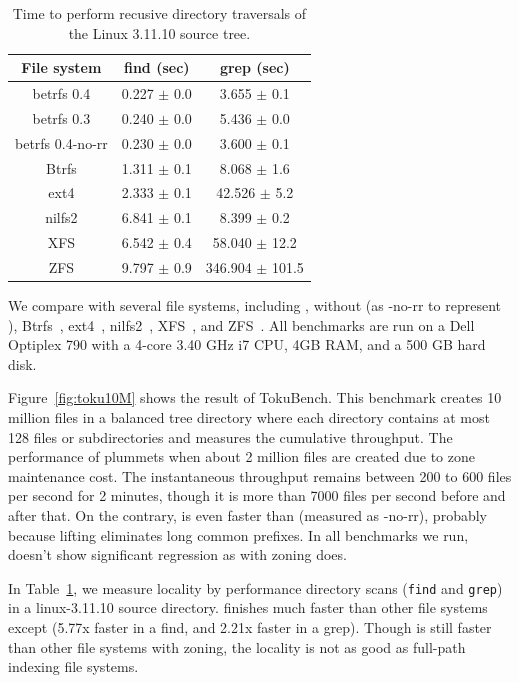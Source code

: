 \begin{table}[t]
  \centering
  \begin{tabular}{c | c c}
    \hline
    File system & find (sec) & grep (sec) \\
    \hline
    \hline
    betrfs 0.4  &  0.227  $\pm$  0.0 &  \xspace3.655  $\pm$ 0.1 \\
    betrfs 0.3  &  0.240  $\pm$  0.0 &  \xspace5.436  $\pm$  0.0 \\
    betrfs 0.4-no-rr  &  0.230  $\pm$  0.0  & \xspace3.600  $\pm$  0.1 \\
    Btrfs  &  1.311  $\pm$  0.1 &  \xspace8.068  $\pm$  1.6 \\
    ext4  &  2.333  $\pm$  0.1 &  42.526  $\pm$  5.2 \\
    nilfs2  &  6.841  $\pm$  0.1 &  \xspace8.399  $\pm$  0.2 \\
    XFS  &  6.542  $\pm$  0.4 &  \xspace58.040  $\pm$  12.2 \\
    ZFS  &  9.797  $\pm$  0.9 &  \xspace346.904  $\pm$  101.5 \\
    \hline
  \end{tabular}
  \caption{\label{tab:dirops} Time to perform recusive directory traversals of the Linux 3.11.10 source tree.}
\end{table}

We compare \betrfsFour with several file systems, including \betrfsThree,
\betrfsFour without \rr (as \betrfsFour-no-rr to represent \betrfsOne),
Btrfs~\cite{btrfs}, ext4~\cite{ext4}, nilfs2~\cite{nilfs2}, XFS~\cite{xfs}, and
ZFS~\cite{zfs}.
All benchmarks are run on a Dell Optiplex 790 with a 4-core 3.40 GHz i7 CPU, 4GB
RAM, and a 500 GB hard disk.

Figure~\ref{fig:toku10M} shows the result of TokuBench.
This benchmark creates 10 million files in a balanced tree directory where each
directory contains at most 128 files or subdirectories and measures the
cumulative throughput.
The performance of \betrfsThree plummets when about 2 million files are
created due to zone maintenance cost.
The instantaneous throughput remains between 200 to 600 files per second for 2
minutes, though it is more than 7000 files per second before and after that.
On the contrary, \betrfsFour is even faster than \betrfsOne (measured
as \betrfsFour-no-rr), probably because lifting eliminates long common
prefixes.
In all benchmarks we run, \betrfsFour doesn't show significant regression as
\betrfsThree with zoning does.

In Table~\ref{tab:dirops}, we measure locality by performance directory scans
(\texttt{find} and \texttt{grep}) in a linux-3.11.10 source directory.
\betrfsFour finishes much faster than other file systems except \betrfsThree
(5.77x faster in a find, and 2.21x faster in a grep).
Though \betrfsThree is still faster than other file systems with zoning, the
locality is not as good as full-path indexing file systems.

